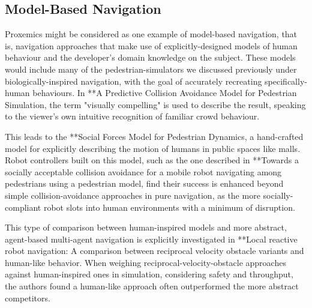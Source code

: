 \documentclass{sfuthesis}
\begin{document}



\subsection{Model-Based Navigation}

Proxemics might be considered as one example of model-based navigation, that is, navigation approaches that make use of explicitly-designed models of human behaviour and the developer's domain knowledge on the subject. These models would include many of the pedestrian-simulators we discussed previously under biologically-inspired navigation, with the goal of accurately recreating specifically-human behaviours. In **A Predictive Collision Avoidance Model for Pedestrian Simulation, the term "visually compelling" is used to describe the result, speaking to the viewer's own intuitive recognition of familiar crowd behaviour.

This leads to the **Social Forces Model for Pedestrian Dynamics, a hand-crafted model for explicitly describing the motion of humans in public spaces like malls. Robot controllers built on this model, such as the one described in **Towards a socially acceptable collision avoidance for a mobile robot navigating among pedestrians using a pedestrian model, find their success is enhanced beyond simple collision-avoidance approaches in pure navigation, as the more socially-compliant robot slots into human environments with a minimum of disruption.

This type of comparison between human-inspired models and more abstract, agent-based multi-agent navigation is explicitly investigated in **Local reactive robot navigation: A comparison between reciprocal velocity obstacle variants and human-like behavior. When weighing reciprocal-velocity-obstacle approaches against human-inspired ones in simulation, considering safety and throughput, the authors found a human-like approach often outperformed the more abstract competitors.
\end{document}
